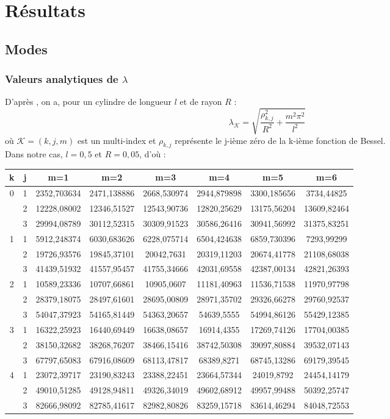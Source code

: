 \chapter{Résultats}
\section{Modes}
\label{resModes}

\subsection{Valeurs analytiques de $\lambda$}

D'après \cite{Saks2005}, on a, pour un cylindre de longueur $l$ et de rayon $R$ :
\[
\lambda_\mathcal{K} = \sqrt{\frac{\rho_{k,j}^2}{R^2} + \frac{m^2\pi^2}{l^2}}
\]
où $\mathcal{K}=(k,j,m)$ est un multi-index et $\rho_{k,j}$ représente le j-ième zéro de la k-ième fonction de Bessel.\\
Dans notre cas, $l=0,5$ et $R=0,05$, d'où :\\
\begin{center}
\begin{tabular}{|*{8}{c|}}
\hline
k & j & m=1 & m=2 & m=3 & m=4 & m=5 & m=6\\
\hline
\multirow{3}{*}{0}
& 1 & 2352,703634&2471,138886&2668,530974&2944,879898&3300,185656&3734,44825\\
& 2 & 12228,08002&12346,51527&12543,90736&12820,25629&13175,56204&13609,82464\\
& 3 & 29994,08789&30112,52315&30309,91523&30586,26416&30941,56992&31375,83251\\
\hline
\multirow{3}{*}{1}
& 1 &5912,248374&6030,683626&6228,075714&6504,424638&6859,730396&7293,99299\\
& 2 &19726,93576&19845,37101&20042,7631&20319,11203&20674,41778&21108,68038\\
& 3 &41439,51932&41557,95457&41755,34666&42031,69558&42387,00134&42821,26393\\ \hline
\multirow{3}{*}{2}
& 1 &10589,23336&10707,66861&10905,0607&11181,40963&11536,71538&11970,97798\\
& 2 &28379,18075&28497,61601&28695,00809&28971,35702&29326,66278&29760,92537\\
& 3 &54047,37923&54165,81449&54363,20657&54639,5555&54994,86126&55429,12385\\
\hline
\multirow{3}{*}{3}
& 1 &16322,25923&16440,69449&16638,08657&16914,4355&17269,74126&17704,00385\\
& 2 &38150,32682&38268,76207&38466,15416&38742,50308&39097,80884&39532,07143\\
& 3 &67797,65083&67916,08609&68113,47817&68389,8271&68745,13286&69179,39545\\
\hline
\multirow{3}{*}{4}
& 1 &23072,39717&23190,83243&23388,22451&23664,57344&24019,8792&24454,14179\\
& 2 &49010,51285&49128,94811&49326,34019&49602,68912&49957,99488&50392,25747\\
& 3 &82666,98092&82785,41617&82982,80826&83259,15718&83614,46294&84048,72553\\
\hline
\end{tabular}
\end{center}

